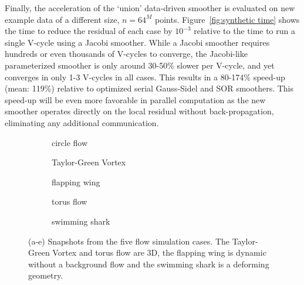 \documentclass[review]{elsarticle}
\begin{document}
Finally, the acceleration of the `union' data-driven smoother is evaluated on new example data of a different size, $n=64^M$ points. Figure~\ref{fig:synthetic time} shows the time to reduce the residual of each case by $10^{-3}$ relative to the time to run a single V-cycle using a Jacobi smoother. While a Jacobi smoother requires  hundreds or even thousands of V-cycles to converge, the Jacobi-like parameterized smoother is only around 30-50\% slower per V-cycle, and yet converges in only 1-3 V-cycles in all cases. This results in a 80-174\% speed-up (mean: 119\%) relative to optimized serial Gauss-Sidel and SOR smoothers. This speed-up will be even more favorable in parallel computation as the new smoother operates directly on the local residual without back-propagation, eliminating any additional communication.

\begin{figure}
    \centering
    \begin{subfigure}[b]{0.3\textwidth}
        \centering
        \caption{circle flow}
        \label{fig:circle}
    \end{subfigure}
    \begin{subfigure}[b]{0.3\textwidth}
        \centering
        \caption{Taylor-Green Vortex}
        \label{fig:TGV}
    \end{subfigure}
    \begin{subfigure}[b]{0.3\textwidth}
        \centering
        \caption{flapping wing}
        \label{fig:wing}
    \end{subfigure}
        \begin{subfigure}{0.47\textwidth}
        \centering
        \caption{torus flow}
        \label{fig:donut}
        \end{subfigure}
        \hfill
        \begin{subfigure}{0.47\textwidth}
        \centering
        \caption{swimming shark}
        \label{fig:shark}
        \end{subfigure}
    \hfill
    \caption{(a-e) Snapshots from the five flow simulation cases. The Taylor-Green Vortex and torus flow are 3D, the flapping wing is dynamic without a background flow and the swimming shark is a deforming geometry.}
    \label{fig:simulation cases}
\end{figure}
\end{document}

